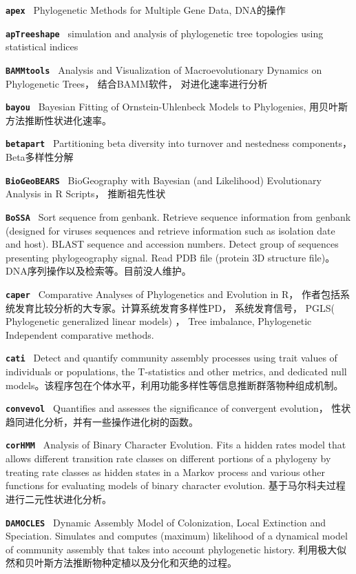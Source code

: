 \documentclass[10pt,landscape]{article}
\newcommand{\bcode}[1]{\texttt{\textbf{#1}}}
\begin{document}
\begin{CJK}{UTF8}{gbsn}
\begin{multicols}{3}
\bcode{apex           } Phylogenetic Methods for Multiple Gene Data, DNA的操作

\bcode{apTreeshape    } simulation and analysis of phylogenetic tree topologies using statistical indices 

\bcode{BAMMtools      } Analysis and Visualization of Macroevolutionary Dynamics on Phylogenetic Trees， 结合BAMM软件， 对进化速率进行分析

\bcode{bayou          } Bayesian Fitting of Ornstein-Uhlenbeck Models to Phylogenies, 用贝叶斯方法推断性状进化速率。 

\bcode{betapart       } Partitioning beta diversity into turnover and nestedness components， Beta多样性分解 

\bcode{BioGeoBEARS    } BioGeography with Bayesian (and Likelihood) Evolutionary Analysis in R Scripts， 推断祖先性状

\bcode{BoSSA          } Sort sequence from genbank. Retrieve sequence information from genbank (designed for viruses sequences and retrieve information such as isolation date and host). BLAST sequence and accession numbers. Detect group of sequences presenting phylogeography signal. Read PDB file (protein 3D structure file)。DNA序列操作以及检索等。目前没人维护。

\bcode{caper          } Comparative Analyses of Phylogenetics and Evolution in R， 作者包括系统发育比较分析的大专家。计算系统发育多样性PD， 系统发育信号， PGLS( Phylogenetic generalized linear models) ， Tree imbalance, Phylogenetic Independent comparative methods.

\bcode{cati           } Detect and quantify community assembly processes using trait values of individuals or populations, the T-statistics and other metrics, and dedicated null models。该程序包在个体水平，利用功能多样性等信息推断群落物种组成机制。 

\bcode{convevol       } Quantifies and assesses the significance of convergent evolution， 性状趋同进化分析，并有一些操作进化树的函数。

\bcode{corHMM         } Analysis of Binary Character Evolution. Fits a hidden rates model that allows different transition rate classes on different portions of a phylogeny by treating rate classes as hidden states in a Markov process and various other functions for evaluating models of binary character evolution. 基于马尔科夫过程进行二元性状进化分析。 

\bcode{DAMOCLES       } Dynamic Assembly Model of Colonization, Local Extinction and Speciation. Simulates and computes (maximum) likelihood of a dynamical model of community assembly that takes into account phylogenetic history. 利用极大似然和贝叶斯方法推断物种定植以及分化和灭绝的过程。 


\end{multicols}
\end{CJK}
\end{document}
